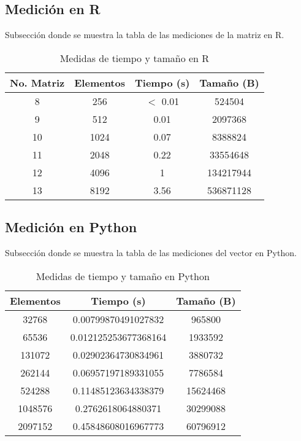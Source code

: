 \documentclass{article}
\begin{document}
\subsection{Medici\'{o}n en R}

Subsecci\'{o}n donde se muestra la tabla de las mediciones de la matriz en R.

\begin{table}[h!]
    \centering
    \caption{Medidas de tiempo y tamaño en R}
    \begin{tabular}{|c|c|c|c|}
    \hline
       No. Matriz  & Elementos & Tiempo (s) & Tamaño (B) \\
       \hline\hline
        8 & 256 & $<$ 0.01 & 524504 \\
        \hline
        9 & 512 & 0.01 & 2097368 \\
        \hline
        10 & 1024 & 0.07 & 8388824 \\
        \hline
        11 & 2048 & 0.22 & 33554648 \\
        \hline
        12 & 4096 & 1 & 134217944 \\
        \hline
        13 & 8192 & 3.56 & 536871128 \\
        \hline
    \end{tabular}
    \label{medir_R}
\end{table}

\subsection{Medici\'{o}n en Python}

Subsecci\'{o}n donde se muestra la tabla de las mediciones del vector en Python.

\begin{table}[h!]
    \centering
    \caption{Medidas de tiempo y tamaño en Python}
    \begin{tabular}{|c|c|c|}
    \hline
      Elementos & Tiempo (s) & Tamaño (B) \\
       \hline\hline
        32768 & 0.00799870491027832 & 965800 \\
        \hline
        65536 & 0.012125253677368164 & 1933592 \\
        \hline
        131072 & 0.02902364730834961 & 3880732 \\
        \hline
        262144 & 0.06957197189331055 & 7786584 \\
        \hline
        524288 & 0.11485123634338379 & 15624468 \\
        \hline
        1048576 & 0.2762618064880371 & 30299088 \\
        \hline
        2097152 & 0.45848608016967773 & 60796912 \\
        \hline
    \end{tabular}
    \label{medir_Py}
\end{table}
\end{document}
